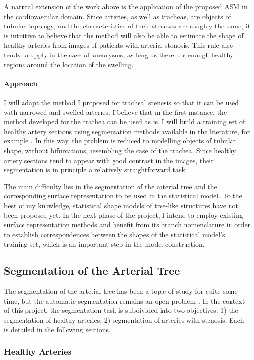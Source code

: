 \documentclass[a4paper]{article}
\newcommand{\approach}{\paragraph{Approach}}
\begin{document}
A natural extension of the work above is the application of the proposed ASM in the cardiovascular domain. Since arteries, as well as tracheae, are objects of tubular topology, and the characteristics of their stenoses are roughly the same, it is intuitive to believe that the method will also be able to estimate the shape of healthy arteries from images of patients with arterial stenosis. This rule also tends to apply in the case of aneurysms, as long as there are enough healthy regions around the location of the swelling.

\approach
I will adapt the method I proposed for tracheal stenosis so that it can be used with narrowed and swelled arteries. I believe that in the first instance, the method developed for the trachea can be used as is. I will build a training set of healthy artery sections using segmentation methods available in the literature, for example \citep{Florez2}. In this way, the problem is reduced to modelling objects of tubular shape, without bifurcations, resembling the case of the trachea. Since healthy artery sections tend to appear with good contrast in the images, their segmentation is in principle a relatively straightforward task. 

The main difficulty lies in the segmentation of the arterial tree and the corresponding surface representation to be used in the statistical model. To the best of my knowledge, statistical shape models of tree-like structures have not been proposed yet. In the next phase of the project, I intend to employ existing surface representation methods \citep{Florez, Antiga} and benefit from its branch nomenclature in order to establish correspondences between the shapes of the statistical model's training set, which is an important step in the model construction. 

\subsection{Segmentation of the Arterial Tree}

The segmentation of the arterial tree has been a topic of study for quite some time, but the automatic segmentation remains an open problem \citep{ORKI-08}. In the context of this project, the segmentation task is subdivided into two objectives: 1) the segmentation of healthy arteries; 2) segmentation of arteries with stenosis. Each is detailed in the following sections.

\subsubsection{Healthy Arteries}
\end{document}
